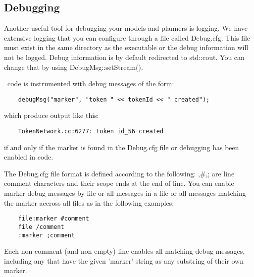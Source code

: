 \documentclass[10pt, letterpaper, twoside]{article}
\begin{document}
\subsection{Debugging}

Another useful tool for debugging your models and planners is logging. We
have extensive logging that you can configure through a file called
Debug.cfg.  This file must exist in the same directory as the executable or
the debug information will not be logged.  Debug information is by default
redirected to std::cout. You can change that by using
DebugMsg::setStream().
 
\ET\, code is instrumented with debug messages of the form:
\begin{verbatim}
	debugMsg("marker", "token " << tokenId << " created");
\end{verbatim}
which produce output like this:
\begin{verbatim}
	TokenNetwork.cc:6277: token id_56 created
\end{verbatim}
if and only if the marker is found in the Debug.cfg file or debugging has
been enabled in code. 

The Debug.cfg file format is defined according to the following: \/,\#,;
are line comment characters and their scope ends at the end of line. You
can enable marker debug messages by file or all messages in a file or all
messages matching the marker accross all files as in the following
examples:
\begin{verbatim}
	file:marker #comment
	file /comment
	:marker ;comment
\end{verbatim}
Each non-comment (and non-empty) line enables all matching debug
messages, including any that have the given 'marker' string as any
substring of their own marker.
\end{document}
